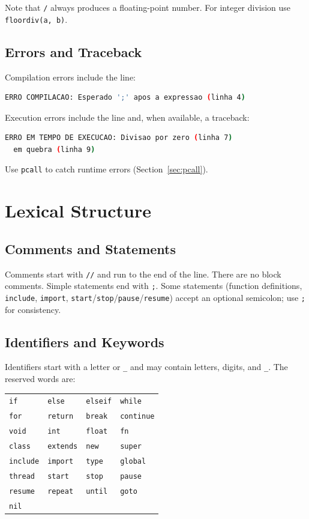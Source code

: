 \documentclass[11pt,a4paper,oneside]{report}
\newcommand{\code}[1]{\texttt{#1}}
\begin{document}
Note that \code{/} always produces a floating-point number. For integer
division use \code{floordiv(a, b)}.

\section{Errors and Traceback}
Compilation errors include the line:
\begin{lstlisting}[language=bash]
ERRO COMPILACAO: Esperado ';' apos a expressao (linha 4)
\end{lstlisting}

Execution errors include the line and, when available, a traceback:
\begin{lstlisting}[language=bash]
ERRO EM TEMPO DE EXECUCAO: Divisao por zero (linha 7)
  em quebra (linha 9)
\end{lstlisting}

Use \code{pcall} to catch runtime errors (Section~\ref{sec:pcall}).

\chapter{Lexical Structure}
\label{cap:lexico}

\section{Comments and Statements}
Comments start with \code{//} and run to the end of the line. There are no
block comments. Simple statements end with \code{;}. Some statements
(function definitions, \code{include}, \code{import},
\code{start}/\code{stop}/\code{pause}/\code{resume}) accept an optional
semicolon; use \code{;} for consistency.

\section{Identifiers and Keywords}
Identifiers start with a letter or \code{\_} and may contain letters,
digits, and \code{\_}. The reserved words are:

\begin{center}
\begin{tabular}{llll}
\toprule
\code{if} & \code{else} & \code{elseif} & \code{while} \\
\code{for} & \code{return} & \code{break} & \code{continue} \\
\code{void} & \code{int} & \code{float} & \code{fn} \\
\code{class} & \code{extends} & \code{new} & \code{super} \\
\code{include} & \code{import} & \code{type} & \code{global} \\
\code{thread} & \code{start} & \code{stop} & \code{pause} \\
\code{resume} & \code{repeat} & \code{until} & \code{goto} \\
\code{nil} & & & \\
\bottomrule
\end{tabular}
\end{center}
\end{document}
